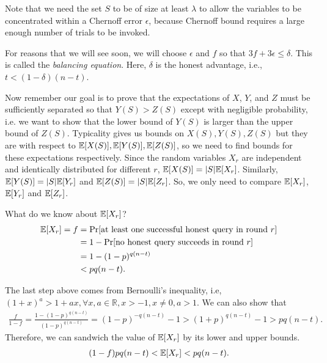 Note that we need the set $S$ to be of size at least $\lambda$ to allow the variables to be concentrated within a Chernoff error $\epsilon$, because Chernoff bound requires a large enough number of trials to be invoked.

For reasons that we will see soon, we will choose $\epsilon$ and $f$ so that $3f + 3\epsilon \leq \delta$. This is called the \emph{balancing equation}. Here, $\delta$ is the honest advantage, i.e., $t < (1-\delta)(n-t)$.

Now remember our goal is to prove that the expectations of $X$, $Y$, and $Z$ must be sufficiently separated so that $Y(S) > Z(S)$ except with negligible probability, i.e. we want to show that the lower bound of $Y(S)$ is larger than the upper bound of $Z(S)$. Typicality gives us bounds on $X(S), Y(S), Z(S)$ but they are with respect to $\mathbb{E}[X(S)], \mathbb{E}[Y(S)], \mathbb{E}[Z(S)]$, so we need to find bounds for these expectations respectively.
Since the random variables $X_r$ are independent and identically distributed for different $r$, $\mathbb{E}[X(S)] = |S|\mathbb{E}[X_r]$. Similarly, $\mathbb{E}[Y(S)] = |S|\mathbb{E}[Y_r]$ and $\mathbb{E}[Z(S)] = |S|\mathbb{E}[Z_r]$. So, we only need to compare $\mathbb{E}[X_r]$, $\mathbb{E}[Y_r]$ and $\mathbb{E}[Z_r]$.

What do we know about $\mathbb{E}[X_r]$?
\begin{align}
    \mathbb{E}[X_r] = f &= \Pr [\text{at least one successful honest query in round $r$}] \nonumber \\
    & = 1 - \Pr [\text{no honest query succeeds in round $r$}] \nonumber \\
    & = 1 - (1-p)^{q(n-t)} \nonumber \\
    & < pq(n-t).
\end{align}

The last step above comes from Bernoulli's inequality, i.e,  $(1+x)^a > 1+ax, \forall x, a \in \mathbb{R}, x > -1, x \neq 0, a > 1$. We can also show that
\begin{align}
\label{eq:f_lower_bound}
    \frac{f}{1-f} = \frac{1-(1-p)^{q(n-t)}}{(1-p)^{q(n-t)}} = (1-p)^{-q(n-t)} -1 > (1+p)^{q(n-t)} - 1 > pq(n-t).
\end{align}
Therefore, we can sandwich the value of $\mathbb{E}[X_r]$ by its lower and upper bounds.
\begin{align}
    (1-f)pq(n-t) < \mathbb{E}[X_r] < pq(n-t).
\end{align}


